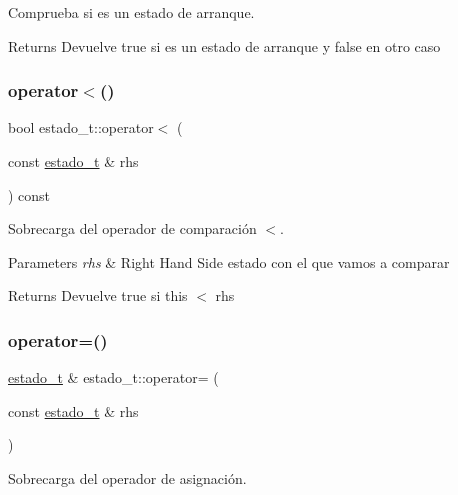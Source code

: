 Comprueba si es un estado de arranque. 

\begin{DoxyReturn}{Returns}
Devuelve true si es un estado de arranque y false en otro caso 
\end{DoxyReturn}
\mbox{\label{classestado__t_a2af7f5f4c4c72009924f4f29aadb533b}} 
\subsubsection{\texorpdfstring{operator$<$()}{operator<()}}
{\footnotesize\ttfamily bool estado\+\_\+t\+::operator$<$ (\begin{DoxyParamCaption}\item[{const \hyperlink{classestado__t}{estado\+\_\+t} \&}]{rhs }\end{DoxyParamCaption}) const\hspace{0.3cm}{\ttfamily [inline]}}



Sobrecarga del operador de comparación $<$. 


\begin{DoxyParams}{Parameters}
{\em rhs} & Right Hand Side estado con el que vamos a comparar \\
\hline
\end{DoxyParams}
\begin{DoxyReturn}{Returns}
Devuelve true si this $<$ rhs 
\end{DoxyReturn}
\mbox{\label{classestado__t_ad7a36a03430853701e4591e05187a14e}} 
\subsubsection{\texorpdfstring{operator=()}{operator=()}}
{\footnotesize\ttfamily \hyperlink{classestado__t}{estado\+\_\+t} \& estado\+\_\+t\+::operator= (\begin{DoxyParamCaption}\item[{const \hyperlink{classestado__t}{estado\+\_\+t} \&}]{rhs }\end{DoxyParamCaption})}



Sobrecarga del operador de asignación. 


